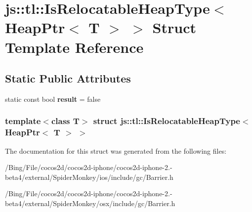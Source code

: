 \hypertarget{structjs_1_1tl_1_1_is_relocatable_heap_type_3_01_heap_ptr_3_01_t_01_4_01_4}{\section{js\-:\-:tl\-:\-:Is\-Relocatable\-Heap\-Type$<$ Heap\-Ptr$<$ T $>$ $>$ Struct Template Reference}
\label{structjs_1_1tl_1_1_is_relocatable_heap_type_3_01_heap_ptr_3_01_t_01_4_01_4}
}
\subsection*{Static Public Attributes}
\begin{DoxyCompactItemize}
\item 
\hypertarget{structjs_1_1tl_1_1_is_relocatable_heap_type_3_01_heap_ptr_3_01_t_01_4_01_4_aaf8b19a235cd5d9cba67fdcd11163799}{static const bool {\bfseries result} = false}\label{structjs_1_1tl_1_1_is_relocatable_heap_type_3_01_heap_ptr_3_01_t_01_4_01_4_aaf8b19a235cd5d9cba67fdcd11163799}

\end{DoxyCompactItemize}
\subsubsection*{template$<$class T$>$ struct js\-::tl\-::\-Is\-Relocatable\-Heap\-Type$<$ Heap\-Ptr$<$ T $>$ $>$}



The documentation for this struct was generated from the following files\-:\begin{DoxyCompactItemize}
\item 
/\-Bing/\-File/cocos2d/cocos2d-\/iphone/cocos2d-\/iphone-\/2.-\/beta4/external/\-Spider\-Monkey/ios/include/gc/Barrier.\-h\item 
/\-Bing/\-File/cocos2d/cocos2d-\/iphone/cocos2d-\/iphone-\/2.-\/beta4/external/\-Spider\-Monkey/osx/include/gc/Barrier.\-h\end{DoxyCompactItemize}
